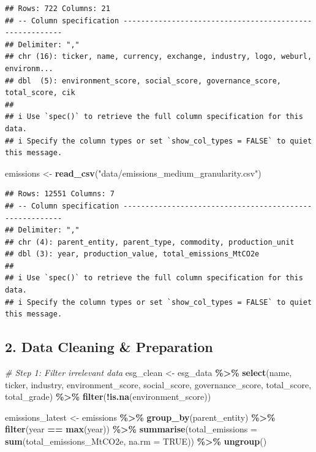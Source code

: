 \documentclass[
]{article}
\newenvironment{Shaded}{\begin{snugshade}}{\end{snugshade}}
\newcommand{\AttributeTok}[1]{\textcolor[rgb]{0.13,0.29,0.53}{#1}}
\newcommand{\CommentTok}[1]{\textcolor[rgb]{0.56,0.35,0.01}{\textit{#1}}}
\newcommand{\ConstantTok}[1]{\textcolor[rgb]{0.56,0.35,0.01}{#1}}
\newcommand{\FunctionTok}[1]{\textcolor[rgb]{0.13,0.29,0.53}{\textbf{#1}}}
\newcommand{\NormalTok}[1]{#1}
\newcommand{\OtherTok}[1]{\textcolor[rgb]{0.56,0.35,0.01}{#1}}
\newcommand{\SpecialCharTok}[1]{\textcolor[rgb]{0.81,0.36,0.00}{\textbf{#1}}}
\newcommand{\StringTok}[1]{\textcolor[rgb]{0.31,0.60,0.02}{#1}}
\begin{document}
\begin{verbatim}
## Rows: 722 Columns: 21
## -- Column specification --------------------------------------------------------
## Delimiter: ","
## chr (16): ticker, name, currency, exchange, industry, logo, weburl, environm...
## dbl  (5): environment_score, social_score, governance_score, total_score, cik
## 
## i Use `spec()` to retrieve the full column specification for this data.
## i Specify the column types or set `show_col_types = FALSE` to quiet this message.
\end{verbatim}

\begin{Shaded}
\begin{Highlighting}[]
\NormalTok{emissions }\OtherTok{\textless{}{-}} \FunctionTok{read\_csv}\NormalTok{(}\StringTok{"data/emissions\_medium\_granularity.csv"}\NormalTok{)}
\end{Highlighting}
\end{Shaded}

\begin{verbatim}
## Rows: 12551 Columns: 7
## -- Column specification --------------------------------------------------------
## Delimiter: ","
## chr (4): parent_entity, parent_type, commodity, production_unit
## dbl (3): year, production_value, total_emissions_MtCO2e
## 
## i Use `spec()` to retrieve the full column specification for this data.
## i Specify the column types or set `show_col_types = FALSE` to quiet this message.
\end{verbatim}

\hypertarget{data-cleaning-preparation}{%
\subsection{2. Data Cleaning \&
Preparation}\label{data-cleaning-preparation}}

\begin{Shaded}
\begin{Highlighting}[]
\CommentTok{\# Step 1: Filter irrelevant data }
\NormalTok{esg\_clean }\OtherTok{\textless{}{-}}\NormalTok{ esg\_data }\SpecialCharTok{\%\textgreater{}\%}
  \FunctionTok{select}\NormalTok{(name, ticker, industry, environment\_score, social\_score, governance\_score, total\_score, total\_grade) }\SpecialCharTok{\%\textgreater{}\%}
  \FunctionTok{filter}\NormalTok{(}\SpecialCharTok{!}\FunctionTok{is.na}\NormalTok{(environment\_score))}

\NormalTok{emissions\_latest }\OtherTok{\textless{}{-}}\NormalTok{ emissions }\SpecialCharTok{\%\textgreater{}\%}
  \FunctionTok{group\_by}\NormalTok{(parent\_entity) }\SpecialCharTok{\%\textgreater{}\%}
  \FunctionTok{filter}\NormalTok{(year }\SpecialCharTok{==} \FunctionTok{max}\NormalTok{(year)) }\SpecialCharTok{\%\textgreater{}\%}
  \FunctionTok{summarise}\NormalTok{(}\AttributeTok{total\_emissions =} \FunctionTok{sum}\NormalTok{(total\_emissions\_MtCO2e, }\AttributeTok{na.rm =} \ConstantTok{TRUE}\NormalTok{)) }\SpecialCharTok{\%\textgreater{}\%}
  \FunctionTok{ungroup}\NormalTok{()}
\end{Highlighting}
\end{Shaded}
\end{document}

